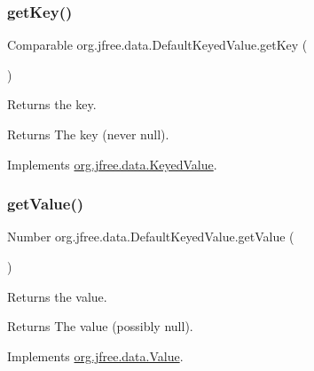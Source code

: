 \subsubsection{\texorpdfstring{get\+Key()}{getKey()}}
{\footnotesize\ttfamily Comparable org.\+jfree.\+data.\+Default\+Keyed\+Value.\+get\+Key (\begin{DoxyParamCaption}{ }\end{DoxyParamCaption})}

Returns the key.

\begin{DoxyReturn}{Returns}
The key (never {\ttfamily null}). 
\end{DoxyReturn}


Implements \mbox{\hyperlink{interfaceorg_1_1jfree_1_1data_1_1_keyed_value_a82fdfea065ff97bd253b44bb89069970}{org.\+jfree.\+data.\+Keyed\+Value}}.

\mbox{\label{classorg_1_1jfree_1_1data_1_1_default_keyed_value_a2eaff5e8eea89cc853a97b60aa4d3966}} 
\subsubsection{\texorpdfstring{get\+Value()}{getValue()}}
{\footnotesize\ttfamily Number org.\+jfree.\+data.\+Default\+Keyed\+Value.\+get\+Value (\begin{DoxyParamCaption}{ }\end{DoxyParamCaption})}

Returns the value.

\begin{DoxyReturn}{Returns}
The value (possibly {\ttfamily null}). 
\end{DoxyReturn}


Implements \mbox{\hyperlink{interfaceorg_1_1jfree_1_1data_1_1_value_a70e7f25d71cbb7eb0cdad970adcfe4b9}{org.\+jfree.\+data.\+Value}}.

\mbox{\label{classorg_1_1jfree_1_1data_1_1_default_keyed_value_ac4a182b187904ab16773e57134156001}} 
